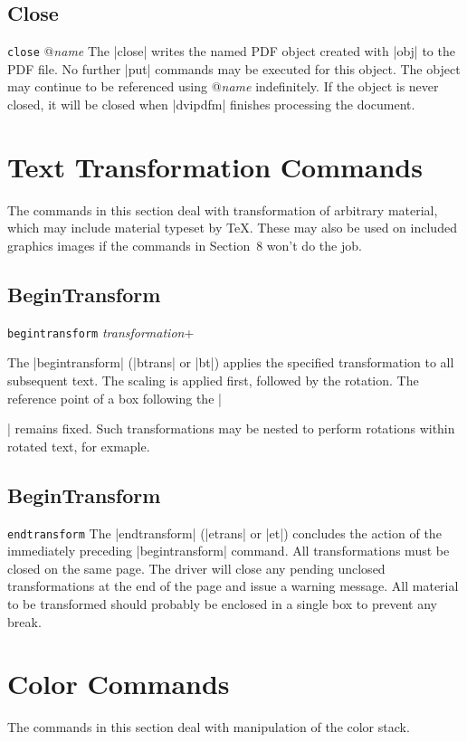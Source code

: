 {\subsection{Close}
\syntax
{\tt close} @{\it name}
\description
The |close| writes the named PDF object created with |obj| to the PDF file.
No further |put| commands may be executed for this object.
The object may continue to be referenced using @{\it name}
indefinitely.  If the object is never closed, it will
be closed when |dvipdfm| finishes processing the document.

\section{Text Transformation Commands}
The commands in this section deal with transformation
of arbitrary material, which may include
material typeset by \TeX.  These
may also be used on included graphics images
if the commands in Section~8 won't do the job.


\subsection{BeginTransform}
\syntax
{\tt begintransform} {\it transformation}+

\description
The |begintransform| (|btrans| or |bt|) applies
the specified transformation to all subsequent text.
The scaling is applied first, followed by the rotation.
The reference point of a box following
the |\special| remains fixed.  Such transformations
may be nested to perform rotations within rotated text, for exmaple.

\example
\begintt
{}
\endtt

\subsection{BeginTransform}
\syntax
{\tt endtransform}
\description
The |endtransform| (|etrans| or |et|) concludes
the action of the immediately preceding |begintransform|
command.  All transformations must be closed
on the same page.  The driver will close
any pending unclosed transformations at the
end of the page and issue a warning message.
All material to be transformed
should probably be enclosed in a single box
to prevent any break.
\example
\begintt
{}
\endtt


\section{Color Commands}
The commands in this section deal with manipulation of the color
stack.

}
